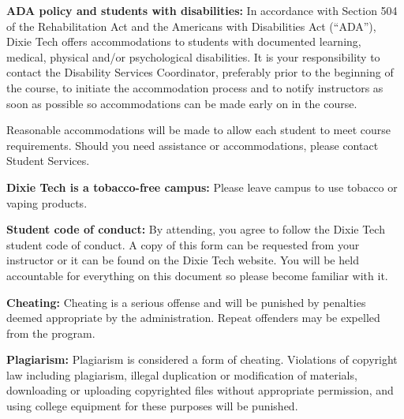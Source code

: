 \textbf{ADA policy and students with disabilities:} In accordance with Section 504 of the Rehabilitation
Act and the Americans with Disabilities Act (“ADA”), Dixie Tech offers accommodations to students
with documented learning, medical, physical and/or psychological disabilities. It is your responsibility to
contact the Disability Services Coordinator, preferably prior to the beginning of the course, to initiate the
accommodation process and to notify instructors as soon as possible so accommodations can be made
early on in the course.
\par
\bigskip
Reasonable accommodations will be made to allow each student to meet course requirements. Should
you need assistance or accommodations, please contact Student Services.
\par
\bigskip
\textbf{Dixie Tech is a tobacco-free campus:} Please leave campus to use tobacco or vaping products.
\par
\bigskip
\textbf{Student code of conduct:} By attending, you agree to follow the Dixie Tech student code of conduct.
A copy of this form can be requested from your instructor or it can be found on the Dixie Tech website.
You will be held accountable for everything on this document so please become familiar with it.
\par
\bigskip
\textbf{Cheating:} Cheating is a serious offense and will be punished by penalties deemed appropriate by the
administration. Repeat offenders may be expelled from the program.
\par
\bigskip
\textbf{Plagiarism:} Plagiarism is considered a form of cheating. Violations of copyright law including plagiarism,
illegal duplication or modification of materials, downloading or uploading copyrighted files without
appropriate permission, and using college equipment for these purposes will be punished.
